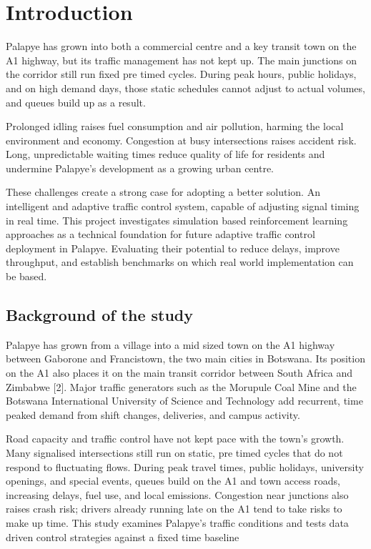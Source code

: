﻿\documentclass[11pt, a4paper]{report}
\begin{document}
\onehalfspacing

\chapter{Introduction}

Palapye has grown into both a commercial centre and a key transit town on the A1
   highway, but its traffic management has not kept up. The main junctions on the
  corridor still run fixed pre timed cycles. During peak hours, public holidays, and on high demand
  days, those static schedules cannot adjust to actual volumes, and queues build
  up as a result.

Prolonged idling raises fuel consumption and air pollution, harming the local environment and economy. Congestion at busy intersections raises accident risk. Long, unpredictable waiting times reduce quality of life for residents and undermine Palapye's development as a growing urban centre.

These challenges create a strong case for adopting a better solution. An intelligent and  adaptive traffic control system, capable of adjusting signal timing in real time. This project investigates simulation based reinforcement learning approaches as a technical foundation for future adaptive traffic control deployment in Palapye.  Evaluating their potential to reduce delays, improve throughput, and establish benchmarks on which real world implementation can be based.

\section{Background of the study}

Palapye has grown from a village into a mid sized town on the A1 highway between
   Gaborone and Francistown, the two main cities in Botswana. Its position on the
  A1 also places it on the main transit corridor between South Africa and Zimbabwe
   [2]. Major traffic generators such as the Morupule Coal Mine and the Botswana
  International University of Science and Technology add recurrent,
  time peaked demand from shift changes, deliveries, and campus activity.

 Road capacity and traffic control have not kept pace with the town's growth.
  Many signalised intersections still run on static, pre timed cycles that do not
  respond to fluctuating flows. During peak travel times, public holidays,
  university openings, and special events, queues build on the A1 and town access
  roads, increasing delays, fuel use, and local emissions. Congestion near
  junctions also raises crash risk; drivers already running late on the A1 tend to
   take risks to make up time. This study examines Palapye's traffic conditions
  and tests data driven control strategies against a fixed time baseline
\end{document}
